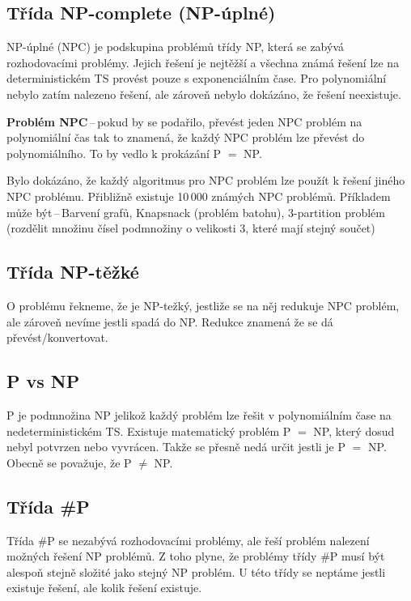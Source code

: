 \subsection{Třída NP-complete (NP-úplné)}

NP-úplné (NPC) je podskupina problémů třídy NP, která se zabývá rozhodovacími problémy.
Jejich řešení je nejtěžší a všechna známá řešení lze na deterministickém TS provést pouze s exponenciálním čase. 
Pro polynomiální nebylo zatím nalezeno řešení, ale zároveň nebylo dokázáno, že řešení neexistuje.

\textbf{Problém NPC}\,--\,pokud by se podařilo, převést jeden NPC problém na polynomiální čas tak to znamená, že každý NPC problém lze převést do polynomiálního. 
To by vedlo k prokázání P $=$ NP.

Bylo dokázáno, že každý algoritmus pro NPC problém lze použít k řešení jiného NPC problému.
Přibližně existuje 10\,000 známých NPC problémů.
Příkladem může být\,--\,Barvení grafů, Knapsnack (problém batohu), 3-partition problém (rozdělit množinu čísel podmnožiny o velikosti 3, které mají stejný součet)

\subsection{Třída NP-těžké}

O problému řekneme, že je NP-težký, jestliže se na něj redukuje NPC problém, ale zároveň nevíme jestli spadá do NP.
Redukce znamená že se dá převést/konvertovat.

\subsection{P vs NP}

P je podmnožina NP jelikož každý problém lze řešit v polynomiálním čase na
 nedeterministickém TS.
Existuje matematický problém P $=$ NP, který dosud nebyl potvrzen nebo vyvrácen. Takže se přesně nedá určit jestli je P $=$ NP. 
Obecně se považuje, že P $\neq$ NP.

\subsection{Třída \#P}

Třída \#P se nezabývá rozhodovacími problémy, ale řeší problém nalezení možných řešení NP problémů. 
Z toho plyne, že problémy třídy \#P musí být alespoň stejně složité jako stejný NP problém.
U této třídy se neptáme jestli existuje řešení, ale kolik řešení existuje.

